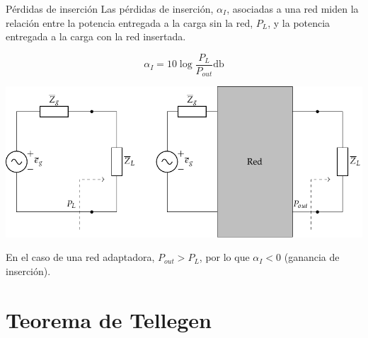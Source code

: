 \documentclass[aspectratio=169, usenames,svgnames,dvipsnames]{beamer}
\begin{document}
\begin{frame}[label={sec:org6d0b687}]{Pérdidas de inserción}
Las pérdidas de inserción, \(\alpha_I\), asociadas a una red miden la relación entre la potencia entregada a la carga sin la red, \(P_L\), y la potencia entregada a la carga con la red insertada.

\[
  \alpha_I = 10 \log \frac{P_L}{P_{out}} \unit{\decibel}
\]

\begin{center}
\includegraphics[height=0.45\textheight]{../figs/PerdidasInsercion.pdf}
\end{center}

En el caso de una red adaptadora, \(P_{out} > P_L\), por lo que \(\alpha_I < 0\) (ganancia de inserción).
\end{frame}

\section{Teorema de Tellegen}
\label{sec:org2af94b6}
\end{document}
